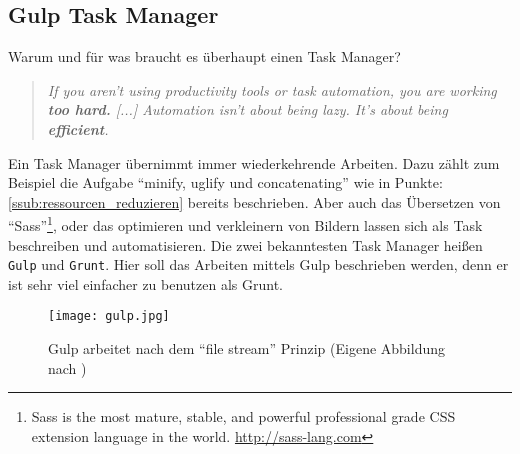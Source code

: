 	\subsection{Gulp Task Manager} %
	\label{sub:gulp_task_manager}
		Warum und für was braucht es überhaupt einen Task Manager?
		\begin{quote}
			\textit{If you aren't using productivity tools or task automation, you are working \textbf{too hard.} [...] Automation isn't about being lazy. It's about being \textbf{efficient}.}\autocite[p. 18,78]{addyOsmani14}
		\end{quote}
		Ein Task Manager übernimmt immer wiederkehrende Arbeiten. Dazu zählt zum Beispiel die Aufgabe "`minify, uglify und concatenating"' wie in Punkte: \ref{ssub:ressourcen_reduzieren} bereits beschrieben. Aber auch das Übersetzen von "`Sass"'\footnote{Sass is the most mature, stable, and powerful professional grade CSS extension language in the world. \url{http://sass-lang.com}}, oder das optimieren und verkleinern von Bildern lassen sich als Task beschreiben und automatisieren.
		Die zwei bekanntesten Task Manager heißen \texttt{Gulp} und \texttt{Grunt}. Hier soll das Arbeiten mittels Gulp beschrieben werden, denn er ist sehr viel einfacher zu benutzen als Grunt.

		\begin{figure}[htbp]
			\begin{center}
				\texttt{[image: gulp.jpg]}
				\caption{Gulp arbeitet nach dem "`file stream"' Prinzip (Eigene Abbildung nach \autocite[p. 85]{addyOsmani14})}
				\label{fig:gulp}
			\end{center}
		\end{figure}

